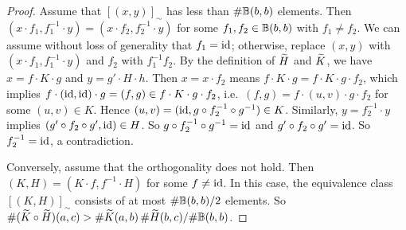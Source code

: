 \begin{proof}
    \ifdraft
    Assume that \( [(x,y)]_{\sim} \) has less than \( \# \mathbb{B}(b,b) \) elements.
    Then \( (x \cdot f_1, f_1^{-1} \cdot y) = (x \cdot f_2, f_2^{-1} \cdot y) \) for some \( f_1, f_2 \in \mathbb{B}(b,b) \) with \( f_1 \neq f_2 \).
    We can assume without loss of generality that \( f_1 = \mathrm{id} \); otherwise, replace \( (x,y) \) with \( (x \cdot f_1, f_1^{-1} \cdot y) \) and \( f_2 \) with \( f_1^{-1} f_2 \).
    By the definition of \( \widetilde{H} \) and \( \widetilde{K} \), we have \( x = f \cdot K \cdot g \) and \( y = g' \cdot H \cdot h \).
    Then \( x = x \cdot f_2 \) means \( f \cdot K \cdot g = f \cdot K \cdot g \cdot f_2 \), which implies \( f \cdot (\mathrm{id}, \mathrm{id}) \cdot g = (f,g) \in f \cdot K \cdot g \cdot f_2 \), i.e.~\( (f,g) = f \cdot (u,v) \cdot g \cdot f_2 \) for some \( (u,v) \in K \).
    Hence \( (u,v) = (\mathrm{id}, g \circ f_2^{-1} \circ g^{-1}) \in K \).
    Similarly, \( y = f_2^{-1} \cdot y \) implies \( (g' \circ f_2 \circ g', \mathrm{id}) \in H \).
    So \( g \circ f_2^{-1} \circ g^{-1} = \mathrm{id} \) and \( g' \circ f_2 \circ g' = \mathrm{id} \).
    So \( f_2^{-1} = \mathrm{id} \), a contradiction.
    \fi

    Conversely, assume that the orthogonality does not hold.
    Then \( (K, H) = (K \cdot f, f^{-1} \cdot H) \) for some \( f \neq \mathrm{id} \).
    In this case, the equivalence class \( [(K,H)]_{\sim} \) consists of at most \( \#\mathbb{B}(b,b)/2 \) elements.
    So \( \#(\widetilde{K} \circ \widetilde{H})(a,c) > \#\widetilde{K}(a,b) \,\#\widetilde{H}(b,c) / \#\mathbb{B}(b,b) \).
\end{proof}

